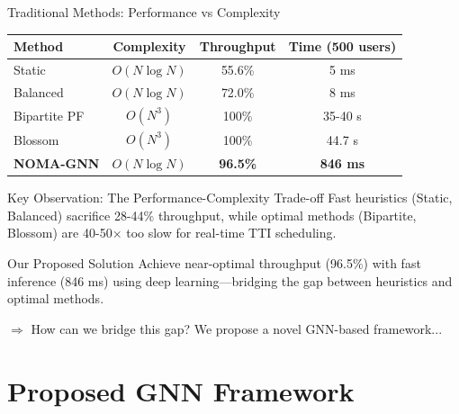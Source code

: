 \documentclass[aspectratio=169]{beamer}
\begin{document}
\begin{frame}{Traditional Methods: Performance vs Complexity}
    \begin{table}
        \centering
        \small
        \begin{tabular}{lccc}
            \toprule
            \textbf{Method} & \textbf{Complexity} & \textbf{Throughput} & \textbf{Time (500 users)} \\
            \midrule
            Static & $O(N \log N)$ & 55.6\% & 5 ms \\
            Balanced & $O(N \log N)$ & 72.0\% & 8 ms \\
            Bipartite PF & $O(N^3)$ & 100\% & 35-40 s \\
            Blossom & $O(N^3)$ & 100\% & 44.7 s \\
            \midrule
            \textbf{NOMA-GNN} & $O(N \log N)$ & \textbf{96.5\%} & \textbf{846 ms} \\
            \bottomrule
        \end{tabular}
    \end{table}
    
    \vspace{0.5cm}
    
    \begin{block}{Key Observation: The Performance-Complexity Trade-off}
        Fast heuristics (Static, Balanced) sacrifice 28-44\% throughput, while optimal methods (Bipartite, Blossom) are 40-50× too slow for real-time TTI scheduling.
    \end{block}
    
    \begin{exampleblock}{Our Proposed Solution}
        Achieve near-optimal throughput (96.5\%) with fast inference (846 ms) using deep learning—bridging the gap between heuristics and optimal methods.
    \end{exampleblock}
    
    \vspace{0.2cm}
    \small \textcolor{iiitblue}{$\Rightarrow$ How can we bridge this gap? We propose a novel GNN-based framework...}
\end{frame}

\section{Proposed GNN Framework}
\end{document}
